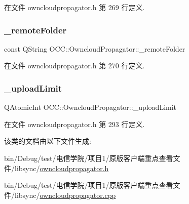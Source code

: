 在文件 owncloudpropagator.\+h 第 269 行定义.

\mbox{\label{class_o_c_c_1_1_owncloud_propagator_af1db4c1fcff6c012e372de47c1814b12}} 
\subsubsection{\texorpdfstring{\+\_\+remote\+Folder}{\_remoteFolder}}
{\footnotesize\ttfamily const Q\+String O\+C\+C\+::\+Owncloud\+Propagator\+::\+\_\+remote\+Folder}



在文件 owncloudpropagator.\+h 第 270 行定义.

\mbox{\label{class_o_c_c_1_1_owncloud_propagator_a5d180311654080414fd82638ad64467d}} 
\subsubsection{\texorpdfstring{\+\_\+upload\+Limit}{\_uploadLimit}}
{\footnotesize\ttfamily Q\+Atomic\+Int O\+C\+C\+::\+Owncloud\+Propagator\+::\+\_\+upload\+Limit}



在文件 owncloudpropagator.\+h 第 293 行定义.



该类的文档由以下文件生成\+:\begin{DoxyCompactItemize}
\item 
bin/\+Debug/test/电信学院/项目1/原版客户端重点查看文件/libsync/\hyperlink{owncloudpropagator_8h}{owncloudpropagator.\+h}\item 
bin/\+Debug/test/电信学院/项目1/原版客户端重点查看文件/libsync/\hyperlink{owncloudpropagator_8cpp}{owncloudpropagator.\+cpp}\end{DoxyCompactItemize}
